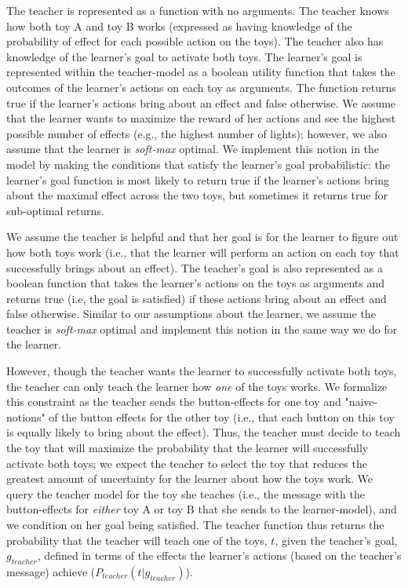 \documentclass[10pt,letterpaper]{article}
\begin{document}
The teacher is represented as a function with no arguments. The teacher knows how both toy A and toy B works (expressed as having knowledge of the probability of effect for each possible action on the toys). The teacher also has knowledge of the learner's goal to activate both toys. The learner's goal is represented within the teacher-model as a boolean utility function that takes the outcomes of the learner's actions on each toy as arguments. The function returns true if the learner's actions bring about an effect and false otherwise. We assume that the learner wants to maximize the reward of her actions and see the highest possible number of effects (e.g., the highest number of lights); however, we also assume that the learner is \textit{soft-max} optimal. We implement this notion in the model by making the conditions that satisfy the learner's goal probabilistic: the learner's goal function is most likely to return true if the learner's actions bring about the maximal effect across the two toys, but sometimes it returns true for sub-optimal returns. 

We assume the teacher is helpful and that her goal is for the learner to figure out how both toys work (i.e., that the learner will perform an action on each toy that successfully brings about an effect). The teacher's goal is also represented as a boolean function that takes the learner's actions on the toys as arguments and returns true (i.e, the goal is satisfied) if these actions bring about an effect and false otherwise. Similar to our assumptions about the learner, we assume the teacher is \textit{soft-max} optimal and implement this notion in the same way we do for the learner. 

However, though the teacher wants the learner to successfully activate both toys, the teacher can only teach the learner how \textit{one} of the toys works. We formalize this constraint as the teacher sends the button-effects for one toy and "naive-notions" of the button effects for the other toy (i.e., that each button on this toy is equally likely to bring about the effect). Thus, the teacher must decide to teach the toy that will maximize the probability that the learner will successfully activate both toys; we expect the teacher to select the toy that reduces the greatest amount of uncertainty for the learner about how the toys work. We query the teacher model for the toy she teaches (i.e., the message with the button-effects for \textit{either} toy A or toy B that she sends to the learner-model), and we condition on her goal being satisfied. The teacher function thus returns the probability that the teacher will teach one of the toys, $t$, given the teacher's goal, $g_{teacher}$, defined in terms of the effects the learner's actions (based on the teacher's message) achieve ($P_{teacher}(t | g_{teacher})$).
\end{document}
